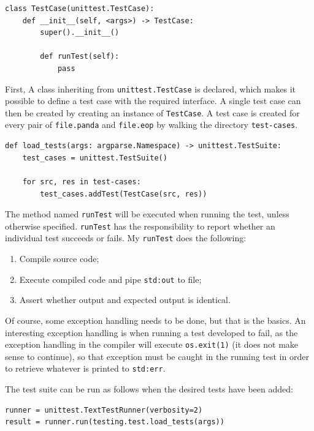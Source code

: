 \begin{verbatim}
class TestCase(unittest.TestCase):
    def __init__(self, <args>) -> TestCase:
        super().__init__()

        def runTest(self):
            pass
\end{verbatim}

First, A class inheriting from \texttt{unittest.TestCase} is declared, which makes it possible to define a test case with the required interface. A single test case can then be created by creating an instance of \texttt{TestCase}. A test case is created for every pair of \texttt{file.panda} and \texttt{file.eop} by walking the directory \texttt{test-cases}.

\begin{verbatim}
def load_tests(args: argparse.Namespace) -> unittest.TestSuite:
    test_cases = unittest.TestSuite()

    for src, res in test-cases:
        test_cases.addTest(TestCase(src, res))
\end{verbatim}

The method named \texttt{runTest} will be executed when running the test, unless otherwise specified. \texttt{runTest} has the responsibility to report whether an individual test succeeds or fails. My \texttt{runTest} does the following:

\begin{enumerate}
    \item Compile source code;
    \item Execute compiled code and pipe \texttt{std:out} to file;
    \item Assert whether output and expected output is identical.
\end{enumerate}

Of course, some exception handling needs to be done, but that is the basics. An interesting exception handling is when running a test developed to fail, as the exception handling in the compiler will execute \texttt{os.exit(1)} (it does not make sense to continue), so that exception must be caught in the running test in order to retrieve whatever is printed to \texttt{std:err}.

The test suite can be run as follows when the desired tests have been added:

\begin{verbatim}
runner = unittest.TextTestRunner(verbosity=2)
result = runner.run(testing.test.load_tests(args))
\end{verbatim}


